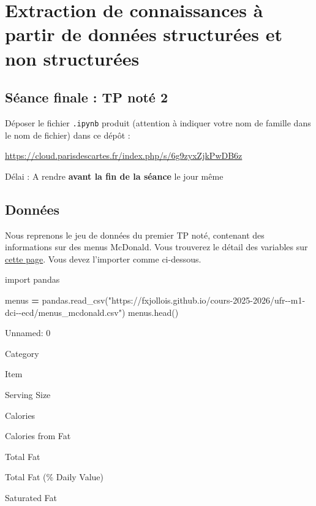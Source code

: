 \documentclass[
]{article}
\author{}
\date{\vspace{-2.5em}}
\newenvironment{Shaded}{\begin{snugshade}}{\end{snugshade}}
\newcommand{\ImportTok}[1]{#1}
\newcommand{\NormalTok}[1]{#1}
\newcommand{\OperatorTok}[1]{\textcolor[rgb]{0.81,0.36,0.00}{\textbf{#1}}}
\newcommand{\StringTok}[1]{\textcolor[rgb]{0.31,0.60,0.02}{#1}}
\begin{document}
\section{Extraction de connaissances à partir de données structurées et
non
structurées}\label{extraction-de-connaissances-uxe0-partir-de-donnuxe9es-structuruxe9es-et-non-structuruxe9es}

\subsection{Séance finale : TP noté
2}\label{suxe9ance-finale-tp-notuxe9-2}

Déposer le fichier \texttt{.ipynb} produit (attention à indiquer votre
nom de famille dans le nom de fichier) dans ce dépôt :

\url{https://cloud.parisdescartes.fr/index.php/s/6g9zyxZjkPwDB6z}

Délai : A rendre \textbf{avant la fin de la séance} le jour même

\subsection{Données}\label{donnuxe9es}

Nous reprenons le jeu de données du premier TP noté, contenant des
informations sur des menus McDonald. Vous trouverez le détail des
variables sur
\href{https://www.kaggle.com/mcdonalds/nutrition-facts}{cette page}.
Vous devez l'importer comme ci-dessous.

\begin{Shaded}
\begin{Highlighting}[]
\ImportTok{import}\NormalTok{ pandas}

\NormalTok{menus }\OperatorTok{=}\NormalTok{ pandas.read\_csv(}\StringTok{"https://fxjollois.github.io/cours{-}2025{-}2026/ufr{-}{-}m1{-}dci{-}{-}ecd/menus\_mcdonald.csv"}\NormalTok{)}
\NormalTok{menus.head()}
\end{Highlighting}
\end{Shaded}

Unnamed: 0

Category

Item

Serving Size

Calories

Calories from Fat

Total Fat

Total Fat (\% Daily Value)

Saturated Fat
\end{document}
